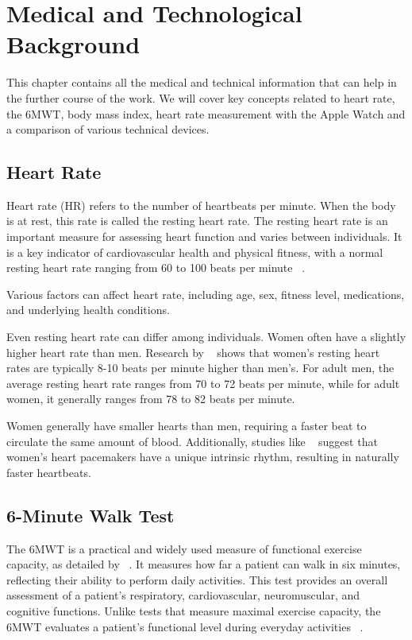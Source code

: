 \chapter{Medical and Technological Background}
\label{cha:background}

This chapter contains all the medical and technical information that can help in the further course of the work. We will cover key concepts related to heart rate, the 6MWT, body mass index, heart rate measurement with the Apple Watch and a comparison of various technical devices.

\section{Heart Rate}
Heart rate (HR) refers to the number of heartbeats per minute. When the body is at rest, this rate is called the resting heart rate. The resting heart rate is an important measure for assessing heart function and varies between individuals. It is a key indicator of cardiovascular health and physical fitness, with a normal resting heart rate ranging from 60 to 100 beats per minute ~\cite{heart}.

Various factors can affect heart rate, including age, sex, fitness level, medications, and underlying health conditions.

Even resting heart rate can differ among individuals. Women often have a slightly higher heart rate than men. Research by ~\textcite{HeartRate_study} shows that women's resting heart rates are typically 8-10 beats per minute higher than men's. For adult men, the average resting heart rate ranges from 70 to 72 beats per minute, while for adult women, it generally ranges from 78 to 82 beats per minute.

Women generally have smaller hearts than men, requiring a faster beat to circulate the same amount of blood. Additionally, studies like ~\textcite{Ryan1994GenderAA} suggest that women's heart pacemakers have a unique intrinsic rhythm, resulting in naturally faster heartbeats.

\section{6-Minute Walk Test}

The 6MWT is a practical and widely used measure of functional exercise capacity, as detailed by ~\textcite{6MWT}. 
It measures how far a patient can walk in six minutes, reflecting their ability to perform daily activities. This test provides an overall assessment of a patient’s respiratory, cardiovascular, neuromuscular, and cognitive functions. Unlike tests that measure maximal exercise capacity, the 6MWT evaluates a patient’s functional level during everyday activities ~\cite{6MWT}.

